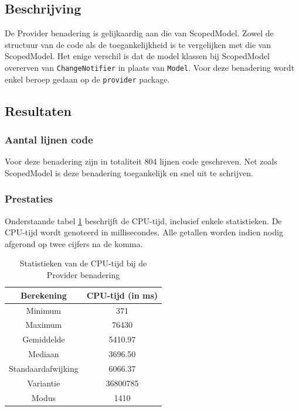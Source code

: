 \subsection{Beschrijving}
De Provider benadering is gelijkaardig aan die van ScopedModel. Zowel de structuur van de code als de toegankelijkheid is te vergelijken met die van ScopedModel. Het enige verschil is dat de model klassen bij ScopedModel overerven van \verb|ChangeNotifier| in plaats van \verb|Model|. \newline
Voor deze benadering wordt enkel beroep gedaan op de \verb|provider| package. 

\subsection{Resultaten}
\subsubsection{Aantal lijnen code}
Voor deze benadering zijn in totaliteit 804 lijnen code geschreven. Net zoals ScopedModel is deze benadering toegankelijk en snel uit te schrijven.

\subsubsection{Prestaties}
Onderstaande tabel \ref{table:experiment-provider-statistics} beschrijft de CPU-tijd, inclusief enkele statistieken. De CPU-tijd wordt genoteerd in millisecondes. Alle getallen worden indien nodig afgerond op twee cijfers na de komma.
\begin{table}[H]
    \centering
    \begin{tabular}{c|c}
        \textbf{Berekening} & \textbf{CPU-tijd (in ms)} \\ \hline
        Minimum             & 371                       \\ \hline
        Maximum             & 76430                     \\ \hline
        Gemiddelde          & 5410.97                   \\ \hline
        Mediaan             & 3696.50                   \\ \hline
        Standaardafwijking  & 6066.37                   \\ \hline
        Variantie           & 36800785                  \\ \hline
        Modus               & 1410                      \\                
    \end{tabular}
    \caption{Statistieken van de CPU-tijd bij de Provider benadering}
    \label{table:experiment-provider-statistics}
\end{table}

